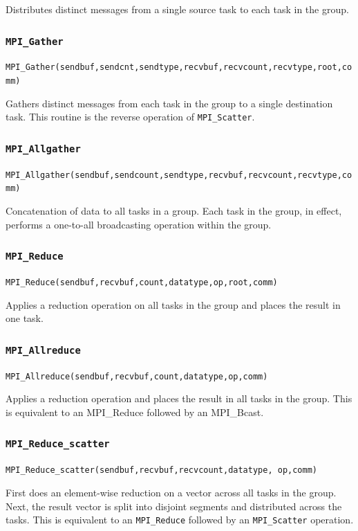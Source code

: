 Distributes distinct messages from a single source task to each task in the group.  

\subsubsection{\texttt{MPI\_Gather}}
\texttt{MPI\_Gather(sendbuf,sendcnt,sendtype,recvbuf,recvcount,recvtype,root,comm)}

Gathers distinct messages from each task in the group to a single destination task. This routine is the reverse operation of \texttt{MPI\_Scatter}.  

\subsubsection{\texttt{MPI\_Allgather}}
\texttt{MPI\_Allgather(sendbuf,sendcount,sendtype,recvbuf,recvcount,recvtype,comm)}

Concatenation of data to all tasks in a group. Each task in the group, in effect, performs a one-to-all broadcasting operation within the group.  

\subsubsection{\texttt{MPI\_Reduce}}
\texttt{MPI\_Reduce(sendbuf,recvbuf,count,datatype,op,root,comm)}

Applies a reduction operation on all tasks in the group and places the result in one task.  

\subsubsection{\texttt{MPI\_Allreduce}}
\texttt{MPI\_Allreduce(sendbuf,recvbuf,count,datatype,op,comm)}

Applies a reduction operation and places the result in all tasks in the group. This is equivalent to an {MPI\_Reduce} followed by an {MPI\_Bcast}.  

\subsubsection{\texttt{MPI\_Reduce\_scatter}}
\texttt{MPI\_Reduce\_scatter(sendbuf,recvbuf,recvcount,datatype, op,comm)}

First does an element-wise reduction on a vector across all tasks in the group. Next, the result vector is split into disjoint segments and distributed across the tasks. This is equivalent to an \texttt{MPI\_Reduce} followed by an \texttt{MPI\_Scatter} operation.  

